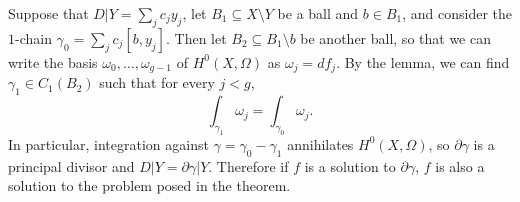 \documentclass[10pt]{article}
\theoremstyle{definition}
\begin{document}
Suppose that $D|Y = \sum_j c_j y_j$, let $B_1 \subseteq X \setminus Y$ be a ball and $b \in B_1$, and consider the $1$-chain $\gamma_0 = \sum_j c_j [b, y_j]$.
Then let $B_2 \subseteq B_1 \setminus b$ be another ball, so that we can write the basis $\omega_0, \dots, \omega_{g - 1}$ of $H^0(X, \Omega)$ as $\omega_j = df_j$.
By the lemma, we can find $\gamma_1 \in C_1(B_2)$ such that for every $j < g$,
$$\int_{\gamma_1} \omega_j = \int_{\gamma_0} \omega_j.$$
In particular, integration against $\gamma = \gamma_0 - \gamma_1$ annihilates $H^0(X, \Omega)$, so $\partial \gamma$ is a principal divisor and $D|Y = \partial \gamma|Y$.
Therefore if $f$ is a solution to $\partial \gamma$, $f$ is also a solution to the problem posed in the theorem.
\end{document}
